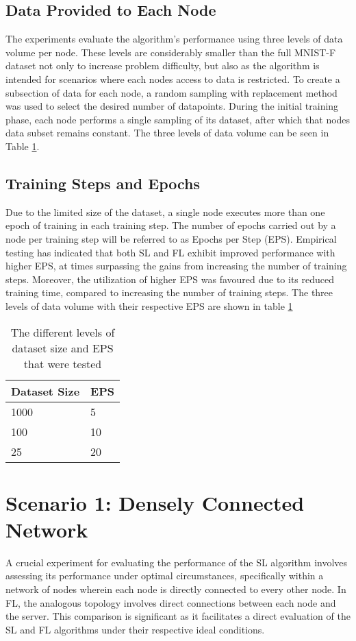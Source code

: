 \subsection{Data Provided to Each Node}
The experiments evaluate the algorithm's performance using three levels of data volume per node. These levels are considerably smaller than the full MNIST-F dataset not only to increase problem difficulty, but also as the algorithm is intended for scenarios where each nodes access to data is restricted. To create a subsection of data for each node, a random sampling with replacement method was used to select the desired number of datapoints. During the initial training phase, each node performs a single sampling of its dataset, after which that nodes data subset remains constant. The three levels of data volume can be seen in Table \ref{epsparams}.

\subsection{Training Steps and Epochs}
Due to the limited size of the dataset, a single node executes more than one epoch of training in each training step. The number of epochs carried out by a node per training step will be referred to as Epochs per Step (EPS). Empirical testing has indicated that both SL and FL exhibit improved performance with higher EPS, at times surpassing the gains from increasing the number of training steps. Moreover, the utilization of higher EPS was favoured due to its reduced training time, compared to increasing the number of training steps. The three levels of data volume with their respective EPS are shown in table \ref{epsparams}

\begin{table}[H]
	\centering
	\begin{tabular}{l|l}
		Dataset Size & EPS \\ \hline \hline
		1000   & 5  \\ \hline
		100   & 10  \\ \hline
		25  & 20 
	\end{tabular}
	\caption{The different levels of dataset size and EPS that were tested} \label{epsparams}
\end{table}

\section{Scenario 1: Densely Connected Network}
A crucial experiment for evaluating the performance of the SL algorithm involves assessing its performance under optimal circumstances, specifically within a network of nodes wherein each node is directly connected to every other node. In FL, the analogous topology involves direct connections between each node and the server. This comparison is significant as it facilitates a direct evaluation of the SL and FL algorithms under their respective ideal conditions.

